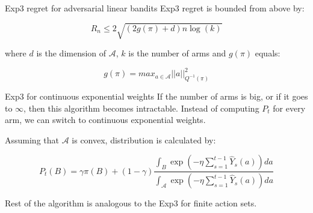 \documentclass[aspectratio=169,xcolor=dvipsnames]{beamer}
\begin{document}
\begin{frame}{Exp3 regret for adversarial linear bandits}
    Exp3 regret is bounded from above by:

    \begin{equation}
        R_n \leq 2 \sqrt{(2g(\pi) + d)n \log(k)}
    \end{equation}

    where $d$ is the dimension of $\mathbf{\mathcal{A}}$, $k$ is the number of arms and $g(\pi)$ equals:

    \begin{equation}
        g(\pi) = max_{a \in \mathbf{\mathcal{A}}} ||a||^2_{Q^{-1}(\pi)}
    \end{equation}
\end{frame}

\begin{frame}{Exp3 for continuous exponential weights}
    If the number of arms is big, or if it goes to $\infty$, then this algorithm becomes intractable. Instead of computing $P_t$ for every arm, we can switch to continuous exponential weights.
    
    Assuming that $\mathbf{\mathcal{A}}$ is convex, distribution is calculated by:

    \begin{equation}
        P_t(B) = \gamma \pi(B) + (1-\gamma) \frac{\int_B \exp \left( - \eta \sum_{s=1}^{t-1} \hat{Y}_s(a) \right)da}{\int_\mathbf{\mathcal{A}} \exp \left( - \eta \sum_{s=1}^{t-1} \hat{Y}_s(a) \right)da}
    \end{equation}

    Rest of the algorithm is analogous to the Exp3 for finite action sets.
\end{frame}
\end{document}
